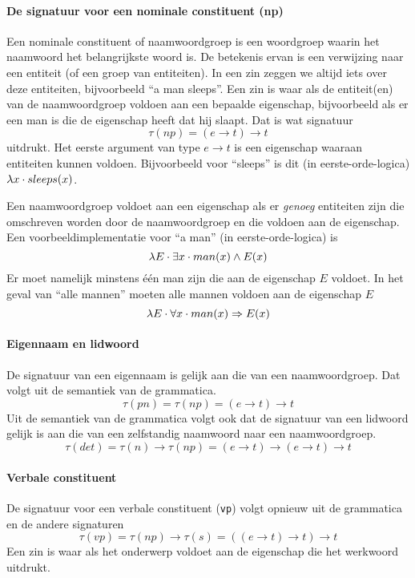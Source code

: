\paragraph{De signatuur voor een nominale constituent (np)} Een nominale constituent of naamwoordgroep is een woordgroep waarin het naamwoord het belangrijkste woord is. De betekenis ervan is een verwijzing naar een entiteit (of een groep van entiteiten). In een zin zeggen we altijd iets over deze entiteiten, bijvoorbeeld ``a man sleeps''. Een zin is waar als de entiteit(en) van de naamwoordgroep voldoen aan een bepaalde eigenschap, bijvoorbeeld als er een man is die de eigenschap heeft dat hij slaapt. Dat is wat signatuur $$\tau(np) = (e \to t) \to t$$ uitdrukt. Het eerste argument van type $e \to t$ is een eigenschap waaraan entiteiten kunnen voldoen. Bijvoorbeeld voor ``sleeps'' is dit (in eerste-orde-logica) $\lambda x \cdot sleeps(x)$.

Een naamwoordgroep voldoet aan een eigenschap als er \textit{genoeg} entiteiten zijn die omschreven worden door de naamwoordgroep en die voldoen aan de eigenschap. Een voorbeeldimplementatie voor ``a man'' (in eerste-orde-logica) is $$\lambda E \cdot \exists x \cdot man(x) \land E(x)$$ Er moet namelijk minstens één man zijn die aan de eigenschap $E$ voldoet. In het geval van ``alle mannen'' moeten alle mannen voldoen aan de eigenschap $E$ $$\lambda E \cdot \forall x \cdot man(x) \Rightarrow E(x)$$

\paragraph{Eigennaam en lidwoord} De signatuur van een eigennaam is gelijk aan die van een naamwoordgroep. Dat volgt uit de semantiek van de grammatica. $$\tau(pn) = \tau(np) = (e \rightarrow t) \rightarrow t$$ Uit de semantiek van de grammatica volgt ook dat de signatuur van een lidwoord gelijk is aan die van een zelfstandig naamwoord naar een naamwoordgroep. $$ \tau(det) = \tau(n) \rightarrow \tau(np) = (e \to t) \rightarrow (e \rightarrow t) \rightarrow t$$ 

\paragraph{Verbale constituent} De signatuur voor een verbale constituent (\texttt{vp}) volgt opnieuw uit de grammatica en de andere signaturen $$\tau(vp) = \tau(np) \rightarrow \tau(s) = ((e \rightarrow t) \rightarrow t) \rightarrow t$$ Een zin is waar als het onderwerp voldoet aan de eigenschap die het werkwoord uitdrukt.

